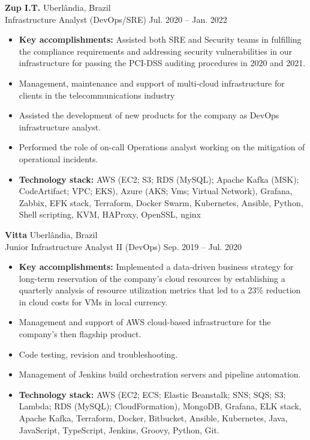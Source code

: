 \documentclass[12pt]{article}
\newcommand{\entry}[4]{{{\textbf{#1}}} \hfill #3 \\ #2 \hfill #4}
\begin{document}
\entry{Zup I.T.}{Infrastructure Analyst (DevOps/SRE)}{Uberlândia, Brazil}{Jul. 2020 -- Jan. 2022}
\begin{itemize}[noitemsep,leftmargin=3.5mm,rightmargin=0mm,topsep=6pt]
  \item \textbf{Key accomplishments:} Assisted both SRE and Security teams in fulfilling the compliance requirements and addressing security vulnerabilities in our infrastructure for passing the PCI-DSS auditing procedures in 2020 and 2021.
  \item Management, maintenance and support of multi-cloud
  infrastructure for clients in the telecommunications industry
  \item Assisted the development of new products for the company as DevOps
  infrastructure analyst.
  \item Performed the role of on-call Operations analyst working on the mitigation
  of operational incidents.
  \item \textbf{Technology stack:} AWS (EC2; S3; RDS (MySQL); Apache Kafka
  (MSK); CodeArtifact; VPC; EKS), Azure (AKS;
  Vms; Virtual Network), Grafana, Zabbix, EFK
  stack, Terraform, Docker Swarm, Kubernetes, Ansible, Python, Shell scripting,
  KVM, HAProxy, OpenSSL, nginx
\end{itemize}

\medskip

\entry{Vitta}{Junior Infrastructure Analyst II (DevOps)}{Uberlândia, Brazil}{Sep. 2019 -- Jul. 2020}
\begin{itemize}[noitemsep,leftmargin=3.5mm,rightmargin=0mm,topsep=6pt]
  \item \textbf{Key accomplishments:} Implemented a data-driven business strategy for long-term reservation of the company's cloud resources by establishing a quarterly analysis of resource utilization metrics that led to a 23\% reduction in cloud costs for VMs in local currency.
  \item Management and support of AWS cloud-based infrastructure for the company’s then flagship product.
  \item Code testing, revision and troubleshooting.
  \item Management of Jenkins build orchestration servers and pipeline automation.
  \item \textbf{Technology stack:} AWS (EC2; ECS; Elastic Beanstalk; SNS; SQS; S3;
  Lambda; RDS (MySQL); CloudFormation), MongoDB, Grafana, ELK stack, Apache Kafka,
  Terraform, Docker, Bitbucket, Ansible, Kubernetes, Java, JavaScript, TypeScript,
  Jenkins, Groovy, Python, Git.
\end{itemize}
\end{document}
